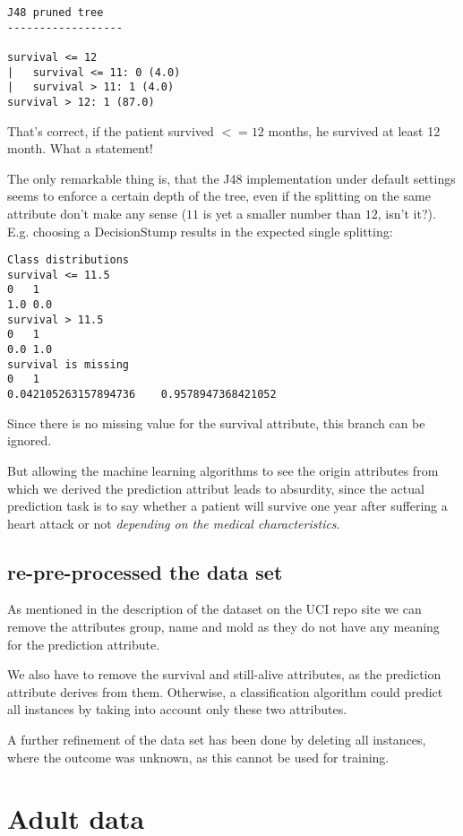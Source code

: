 \documentclass[paper=a4, fontsize=11pt]{scrartcl} %
\numberwithin{equation}{section} %
\numberwithin{figure}{section} %
\numberwithin{table}{section} %
\begin{document}
\begin{verbatim}
J48 pruned tree
------------------

survival <= 12
|   survival <= 11: 0 (4.0)
|   survival > 11: 1 (4.0)
survival > 12: 1 (87.0)
\end{verbatim}

That's correct, if the patient survived $ <= 12 $ months, he survived at least 12 month. What a statement! 

The only remarkable thing is, that the J48 implementation under default settings seems to enforce a certain depth of the tree, even if the splitting on the same attribute don't make any sense ($ 11 $ is yet a smaller number than $ 12 $, isn't it?). E.g. choosing a DecisionStump results in the expected single splitting: 
\begin{verbatim}
Class distributions
survival <= 11.5
0   1   
1.0 0.0 
survival > 11.5
0   1   
0.0 1.0 
survival is missing
0   1   
0.042105263157894736    0.9578947368421052
\end{verbatim}
Since there is no missing value for the survival attribute, this branch can be ignored.

But allowing the machine learning algorithms to see the origin attributes from which we derived the prediction attribut leads to absurdity, since the actual prediction task is to say whether a patient will survive one year after suffering a heart attack or not \emph{depending on the medical characteristics}.


\subsection{re-pre-processed the data set}

As mentioned in the description of the dataset on the UCI repo site we can remove the attributes group, name and mold as they do not have any meaning for the prediction attribute.

We also have to remove the survival and still-alive attributes, as the prediction attribute derives from them. Otherwise, a classification algorithm could predict all instances by taking into account only these two attributes.

A further refinement of the data set has been done by deleting all instances, where the outcome was unknown, as this cannot be used for training.




\section{Adult data}
\end{document}
